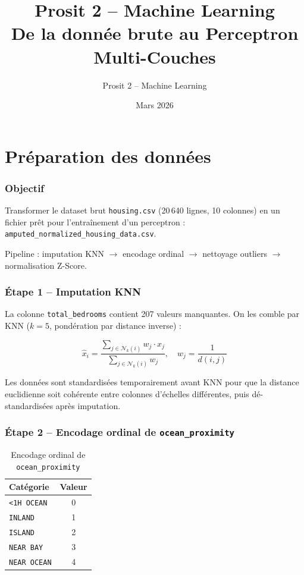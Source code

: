 \documentclass[a4paper,11pt]{article}
\title{Prosit 2 -- Machine Learning\\{\large De la donn\'ee brute au Perceptron Multi-Couches}}
\author{Prosit 2 -- Machine Learning}
\date{Mars 2026}
\begin{document}
\maketitle
\tableofcontents
\newpage

\part{Pr\'eparation des donn\'ees}

\section{Objectif}

Transformer le dataset brut \texttt{housing.csv} (20\,640 lignes, 10 colonnes) en un fichier pr\^et pour l'entra\^inement d'un perceptron : \texttt{amputed\_normalized\_housing\_data.csv}.

Pipeline : imputation KNN $\to$ encodage ordinal $\to$ nettoyage outliers $\to$ normalisation Z-Score.

\section{\'Etape 1 -- Imputation KNN}

La colonne \texttt{total\_bedrooms} contient 207 valeurs manquantes. On les comble par KNN ($k=5$, pond\'eration par distance inverse) :

\begin{equation}
\hat{x}_i = \frac{\sum_{j \in \mathcal{N}_k(i)} w_j \cdot x_j}{\sum_{j \in \mathcal{N}_k(i)} w_j}, \quad w_j = \frac{1}{d(i,j)}
\end{equation}

Les donn\'ees sont standardis\'ees temporairement avant KNN pour que la distance euclidienne soit coh\'erente entre colonnes d'\'echelles diff\'erentes, puis d\'e-standardis\'ees apr\`es imputation.

\section{\'Etape 2 -- Encodage ordinal de \texttt{ocean\_proximity}}

\begin{table}[h]
\centering
\begin{tabular}{lc}
\toprule
\textbf{Cat\'egorie} & \textbf{Valeur} \\
\midrule
\texttt{<1H OCEAN}  & 0 \\
\texttt{INLAND}     & 1 \\
\texttt{ISLAND}     & 2 \\
\texttt{NEAR BAY}   & 3 \\
\texttt{NEAR OCEAN} & 4 \\
\bottomrule
\end{tabular}
\caption{Encodage ordinal de \texttt{ocean\_proximity}}
\end{table}
\end{document}
